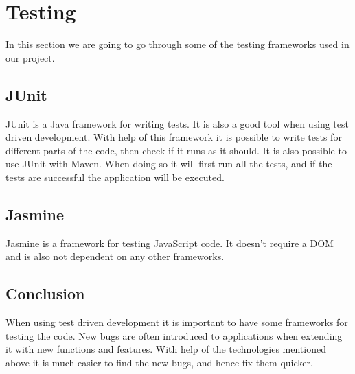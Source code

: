 \section{Testing}
\label{section:testing}

In this section we are going to go through some of the testing frameworks used in our project.

\subsection{JUnit} \nocite{JUnit}

JUnit is a Java framework for writing tests. It is also a good tool when using test driven development.
With help of this framework it is possible to write tests for different parts of the code, then check if it runs as it should.
It is also possible to use JUnit with Maven.
When doing so it will first run all the tests, and if the tests are successful the application will be executed.

\subsection{Jasmine} \nocite{Jasmine}

Jasmine is a framework for testing JavaScript code.	
It doesn't require a DOM and is also not dependent on any other frameworks.

\subsection{Conclusion}

When using test driven development it is important to have some frameworks for testing the code.
New bugs are often introduced to applications when extending it with new functions and features.
With help of the technologies mentioned above it is much easier to find the new bugs, and hence fix them quicker.


